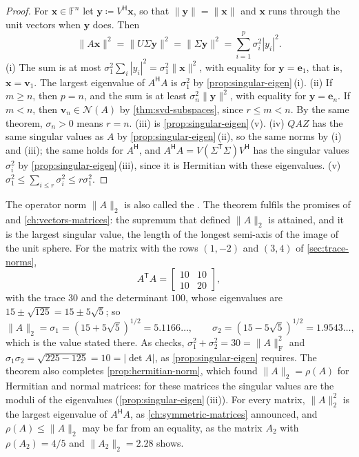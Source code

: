\begin{proof}
For $\mathbf x\in\mathbb F^n$ let $\mathbf y\coloneqq V^{\mathsf H}\mathbf x$, so that $\|\mathbf y\|=\|\mathbf x\|$ and $\mathbf x$ runs through the unit vectors when $\mathbf y$ does. Then
\[
\|A\mathbf x\|^2=\|U\Sigma\mathbf y\|^2=\|\Sigma\mathbf y\|^2=\sum_{i=1}^p\sigma_i^2|y_i|^2 .
\]
(i) The sum is at most $\sigma_1^2\sum_i|y_i|^2=\sigma_1^2\|\mathbf x\|^2$, with equality for $\mathbf y=\mathbf e_1$, that is, $\mathbf x=\mathbf v_1$. The largest eigenvalue of $A^{\mathsf H}A$ is $\sigma_1^2$ by \cref{prop:singular-eigen}\,(i). (ii) If $m\ge n$, then $p=n$, and the sum is at least $\sigma_n^2\|\mathbf y\|^2$, with equality for $\mathbf y=\mathbf e_n$. If $m<n$, then $\mathbf v_n\in\mathcal N(A)$ by \cref{thm:svd-subspaces}, since $r\le m<n$. By the same theorem, $\sigma_n>0$ means $r=n$. (iii) is \cref{prop:singular-eigen}\,(v). (iv) $QAZ$ has the same singular values as $A$ by \cref{prop:singular-eigen}\,(ii), so the same norms by (i) and (iii); the same holds for $A^{\mathsf H}$, and $A^{\mathsf H}A=V(\Sigma^{\mathsf T}\Sigma)V^{\mathsf H}$ has the singular values $\sigma_i^2$ by \cref{prop:singular-eigen}\,(iii), since it is Hermitian with these eigenvalues. (v) $\sigma_1^2\le\sum_{i\le r}\sigma_i^2\le r\sigma_1^2$.
\end{proof}

The operator norm $\|A\|_2$ is also called the . The theorem fulfils the promises of  and \cref{ch:vectors-matrices}: the supremum that defined $\|A\|_2$ is attained, and it is the largest singular value, the length of the longest semi-axis of the image of the unit sphere. For the matrix with the rows $(1,-2)$ and $(3,4)$ of \cref{sec:trace-norms},
\[
A^{\mathsf T}A=\begin{bmatrix}10&10\\10&20\end{bmatrix},
\]
with the trace $30$ and the determinant $100$, whose eigenvalues are $15\pm\sqrt{125}=15\pm5\sqrt5$; so
\[
\|A\|_2=\sigma_1=(15+5\sqrt5)^{1/2}=5.1166\ldots,\qquad\sigma_2=(15-5\sqrt5)^{1/2}=1.9543\ldots,
\]
which is the value stated there. As checks, $\sigma_1^2+\sigma_2^2=30=\|A\|_{\mathrm F}^2$ and $\sigma_1\sigma_2=\sqrt{225-125}=10=|\det A|$, as \cref{prop:singular-eigen} requires. The theorem also completes \cref{prop:hermitian-norm}, which found $\|A\|_2=\rho(A)$ for Hermitian and normal matrices: for these matrices the singular values are the moduli of the eigenvalues (\cref{prop:singular-eigen}\,(iii)). For every matrix, $\|A\|_2^2$ is the largest eigenvalue of $A^{\mathsf H}A$, as \cref{ch:symmetric-matrices} announced, and $\rho(A)\le\|A\|_2$ may be far from an equality, as the matrix $A_2$ with $\rho(A_2)=4/5$ and $\|A_2\|_2=2.28$ shows.

